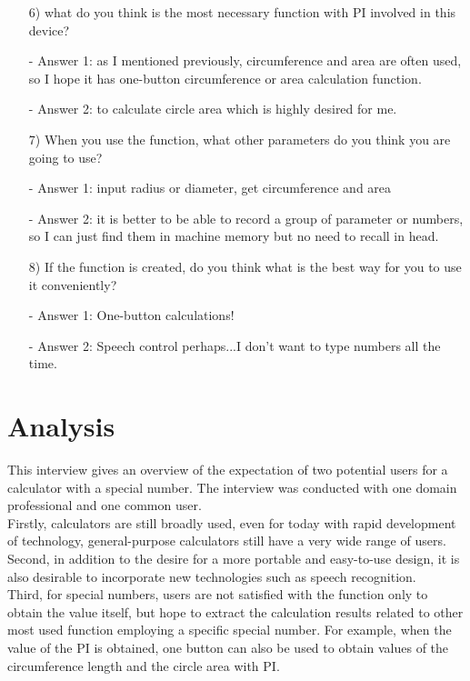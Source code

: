 \begin{itemize}
\item[6)]what do you think is the most necessary function with PI involved in this device?
\item[-]Answer 1: as I mentioned previously, circumference and area are often used, so I hope it has one-button circumference or area calculation function.
\item[-]Answer 2: to calculate circle area which is highly desired for me.


\item[7)]When you use the function, what other parameters do you think you are going to use?
\item[-]Answer 1: input radius or diameter, get circumference and area
\item[-]Answer 2: it is better to be able to record a group of parameter or numbers, so I can just find them in machine memory but no need to recall in head.

\item[8)]If the function is created, do you think what is the best way for you to use it conveniently?
\item[-]Answer 1: One-button calculations!
\item[-]Answer 2: Speech control perhaps...I don't want to type numbers all the time.

\end{itemize}

\section{Analysis}
\vspace{8pt}
\noindent
This interview gives an overview of  the expectation of two potential users for a calculator with a special number.  The interview was conducted with one domain professional and one common user.\\
 \hfill\break
Firstly, calculators are still broadly used, even for today with rapid development of technology, general-purpose calculators still have a very wide range of users.\\
 \hfill\break
Second, in addition to the desire for a more portable and easy-to-use design, it is also desirable to incorporate new technologies such as speech recognition.\\
 \hfill\break
Third, for special numbers, users are not satisfied with the function only to obtain the value itself, but hope to extract the calculation results related to other most used function employing a specific special number. For example, when the value of the PI is obtained, one button can also be used to obtain values of the circumference length and the circle area with PI.